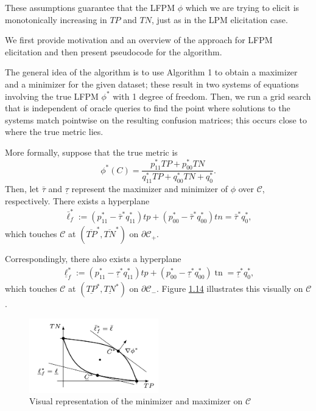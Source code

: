 \documentclass[
  letterpaper,
  DIV=11,
  numbers=noendperiod,
  oneside]{scrreprt}
\theoremstyle{remark}
\begin{document}
These assumptions guarantee that the LFPM \(\phi\) which we are trying
to elicit is monotonically increasing in \(TP\) and \(TN\), just as in
the LPM elicitation case.

We first provide motivation and an overview of the approach for LFPM
elicitation and then present pseudocode for the algorithm.

The general idea of the algorithm is to use Algorithm 1 to obtain a
maximizer and a minimizer for the given dataset; these result in two
systems of equations involving the true LFPM \(\phi^*\) with 1 degree of
freedom. Then, we run a grid search that is independent of oracle
queries to find the point where solutions to the systems match pointwise
on the resulting confusion matrices; this occurs close to where the true
metric lies.

More formally, suppose that the true metric is
\[\phi^{*}(C)=\frac{p_{11}^{*} T P+p_{00}^{*} T N}{q_{11}^{*} T P+q_{00}^{*} T N+q_{0}^{*}}.\]
Then, let \(\bar{\tau}\) and \(\underline{\tau}\) represent the
maximizer and minimizer of \(\phi\) over \(\mathcal{C}\), respectively.
There exists a hyperplane \[\begin{aligned}
\bar{\ell}_{f}^{*}:=\left(p_{11}^{*}-\bar{\tau}^{*} q_{11}^{*}\right) t p+\left(p_{00}^{*}-\bar{\tau}^{*} q_{00}^{*}\right) t n=\bar{\tau}^{*} q_{0}^{*},
\end{aligned}\] which touches \(\mathcal{C}\) at
\(\left(\overline{T P}^{*}, \overline{T N}^{*}\right)\) on
\(\partial \mathcal{C}_{+}\).

Correspondingly, there also exists a hyperplane \[\begin{aligned}
\underline{\ell}_{f}^{*}:=\left(p_{11}^{*}-\underline{\tau}^{*} q_{11}^{*}\right) t p+\left(p_{00}^{*}-\underline{\tau}^{*} q_{00}^{*}\right) \operatorname{tn}=\underline{\tau}^{*} q_{0}^{*},
\end{aligned}\] which touches \(\mathcal{C}\) at
\(\left(\underline{TP}^{*}, \underline{T N}^{*}\right)\) on
\(\partial \mathcal{C}_{-}\). Figure \hyperref[minmax]{1.14} illustrates
this visually on \(\mathcal{C}\).

\begin{figure}

{\centering \includegraphics[width=0.5\textwidth,height=\textheight]{src/Figures/Screenshot 2023-11-13 at 6.56.52 PM.png}

}

\caption{Visual representation of the minimizer and maximizer on
\(\mathcal{C}\)}

\end{figure}%
\end{document}
